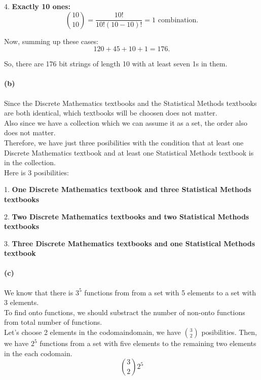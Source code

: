 \documentclass[12pt]{article}
\begin{document}
4. \textbf{Exactly 10 ones:}
   \[
   \binom{10}{10} = \frac{10!}{10!(10-10)!} = 1 \text{ combination.}
   \]

Now, summing up these cases:
\[
120 + 45 + 10 + 1 = 176.
\]

So, there are 176 bit strings of length 10 with at least seven 1s in them.


\paragraph{(b)}

   Since the Discrete Mathematics textbooks and the Statistical Methods textbooks are both identical, which textbooks will be choosen does not matter.\\

   Also since we have a collection which we can assume it as a set, the order also does not matter.\\

   Therefore, we have just three posibilities with the condition that at least one Discrete Mathematics textbook and at least one Statistical Methods textbook is in the collection.\\

   Here is 3 posibilities:

1. \textbf{One Discrete Mathematics textbook and three Statistical Methods textbooks}
   
2. \textbf{Two Discrete Mathematics textbooks and two Statistical Methods textbooks}

3. \textbf{Three Discrete Mathematics textbooks and one Statistical Methods textbook}

\paragraph{(c)}

We know that there is \(3^5\) functions from from a set with 5 elements to a set with 3 elements. \\

To find onto functions, we should substract the number of non-onto functions from total number of functions.\\

Let's choose 2 elements in the codomaindomain, we have \(\binom{3}{2}\) posibilities. Then, we have \(2^5\) functions from a set with five elements to the remaining two elements in the each codomain. \\
\[
\binom{3}{2}2^5
\]
\end{document}
